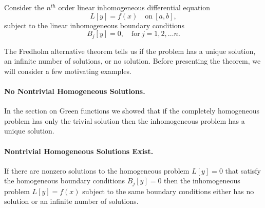 Consider the $n^{t h}$ order linear inhomogeneous differential equation
\[ L[y] = f(x) \quad \mathrm{on}\ [a,b],\]
subject to the linear inhomogeneous boundary conditions
\[ B_j[y] = 0, \quad \mathrm{for}\ j = 1, 2, \ldots n.\]


The Fredholm alternative theorem tells us if the problem has a unique solution,
an infinite number of solutions, or no solution.  Before presenting the
theorem, we will consider a few motivating examples.
















\paragraph{No Nontrivial Homogeneous Solutions.}
In the section on Green functions we showed that if the completely 
homogeneous problem has only the trivial solution then the inhomogeneous
problem has a unique solution.

\paragraph{Nontrivial Homogeneous Solutions Exist.}
If there are nonzero solutions to the homogeneous problem
$L[y]=0$ that satisfy the 
homogeneous boundary conditions $B_j[y]=0$ then 
the inhomogeneous problem $L[y] = f(x)$ subject to the same boundary
conditions either has no solution or an infinite number of solutions.

